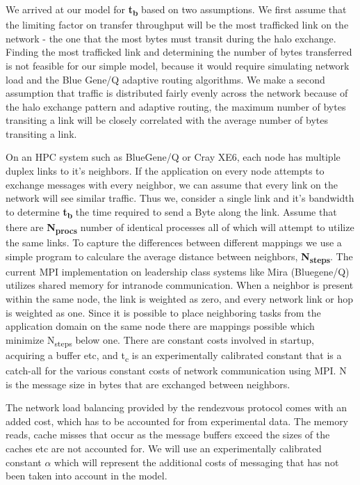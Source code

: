 \documentclass{acm_proc_article-sp}
\begin{document}
We arrived at our model for \textbf{t\textsubscript{b}} based on two assumptions.
We first assume that the limiting factor on transfer throughput will be
the most trafficked link on the network - the one that the most bytes
must transit during the halo exchange.  Finding the most trafficked
link and determining the number of bytes transferred is not feasible for our
simple model, because it would require simulating network load and
the Blue Gene/Q adaptive routing algorithms. We make a second assumption
that traffic is distributed fairly evenly across the network because of
the halo exchange pattern and adaptive routing, the maximum number of bytes
transiting a link will be closely correlated with the average number of bytes transiting a link.

On an HPC system such as BlueGene/Q or Cray XE6, each node has multiple duplex links to it's neighbors.
If the application on every node attempts to exchange messages with every neighbor, we can assume that
every link on the network will see similar traffic. Thus we, consider a single link and it's bandwidth
to determine \textbf{t\textsubscript{b}} the time required to send a Byte along the link.
Assume that there are \textbf{N\textsubscript{procs}} number of identical processes all of which will attempt to utilize the same links.
To capture the differences between different mappings we use a simple program to calculare the average distance between neighbors,
\textbf{N\textsubscript{steps}}. The current MPI implementation on leadership class systems like Mira (Bluegene/Q) utilizes
shared memory for intranode communication. When a neighbor is present within the same node, the link
is weighted as zero, and every network link or hop is weighted as one. Since it is possible to place
neighboring tasks from the application domain on the same node there are mappings possible which
minimize N\textsubscript{steps} below one. There are constant costs involved in startup, acquiring a buffer etc,
and t\textsubscript{c} is an experimentally calibrated constant that is a catch-all for the various constant costs
of network communication using MPI. N is the message size in bytes that are exchanged between neighbors.

The network load balancing provided by the rendezvous protocol comes with an added cost, which has to be
accounted for from experimental data. The memory reads, cache misses that occur as the message buffers exceed
the sizes of the caches etc are not accounted for. We will use an experimentally calibrated constant \textbf{$\alpha$}
which will represent the additional costs of messaging that has not been taken into account in the model.
\end{document}
